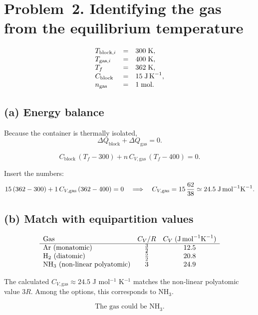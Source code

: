 \documentclass[12pt]{article}
\theoremstyle{definition} %
\theoremstyle{plain} %
\begin{document}
\section*{Problem 2.  Identifying the gas from the equilibrium temperature}

\vspace{-0.5em}
\[
\begin{array}{lcl}
T_{\text{block},i} &=& 300\;\text{K},\\
T_{\text{gas},i}   &=& 400\;\text{K},\\
T_f               &=& 362\;\text{K},\\
C_{\text{block}}  &=& 15\;\text{J\,K}^{-1},\\
n_{\text{gas}}    &=& 1\;\text{mol}.
\end{array}
\]

\subsection*{(a) Energy balance}

Because the container is thermally isolated,
\[
\Delta Q_{\text{block}} + \Delta Q_{\text{gas}} = 0.
\]

\[
C_{\text{block}}\,(T_f - 300)
   + n\,C_{V,\text{gas}}\,(T_f - 400) = 0.
\]

Insert the numbers:
\[
15\,(362 - 300)
   + 1\,C_{V,\text{gas}}\,(362 - 400) = 0
\quad\Longrightarrow\quad
C_{V,\text{gas}}
   = 15\,\frac{62}{38} \simeq 24.5\;\text{J\,mol}^{-1}\text{K}^{-1}.
\]

\subsection*{(b) Match with equipartition values}

\[
\begin{array}{lcc}
\text{Gas} & C_V/R & C_V\;(\text{J\,mol}^{-1}\text{K}^{-1}) \\ \hline
\text{Ar (monatomic)} & \tfrac{3}{2} & 12.5 \\
\text{H}_2\ \text{(diatomic)} & \tfrac{5}{2} & 20.8 \\
\text{NH}_3\ \text{(non‑linear polyatomic)} & 3 & 24.9
\end{array}
\]

The calculated $C_{V,\text{gas}}\approx 24.5$ J mol\(^{-1}\) K\(^{-1}\)
matches the non‑linear polyatomic value \(3R\).  Among the options, this
corresponds to \(\mathrm{NH_3}\).

\[
\boxed{\text{The gas could be NH}_3.}
\]
\end{document}
